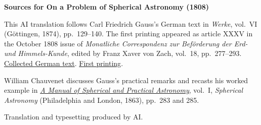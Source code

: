 \clearpage\thispagestyle{empty}
\begin{center}\textbf{Sources for On a Problem of Spherical Astronomy (1808)}\end{center}
\noindent This AI translation follows Carl Friedrich Gauss’s German text in \textit{Werke}, vol.~VI (Göttingen, 1874), pp.~129--140. The first printing appeared as article XXXV in the October 1808 issue of \textit{Monatliche Correspondenz zur Beförderung der Erd- und Himmels-Kunde}, edited by Franz Xaver von Zach, vol.~18, pp.~277--293. \href{https://gdz.sub.uni-goettingen.de/id/PPN236007467}{Collected German text}. \href{https://www.digitale-sammlungen.de/en/view/bsb10538609?page=299}{First printing}.
\par\smallskip\noindent William Chauvenet discusses Gauss’s practical remarks and recasts his worked example in \href{https://archive.org/details/amanualspherica06chaugoog/page/n291/mode/1up}{\textit{A Manual of Spherical and Practical Astronomy}}, vol.~I, \textit{Spherical Astronomy} (Philadelphia and London, 1863), pp.~283 and 285.
\par\smallskip\noindent Translation and typesetting produced by AI.
\clearpage
